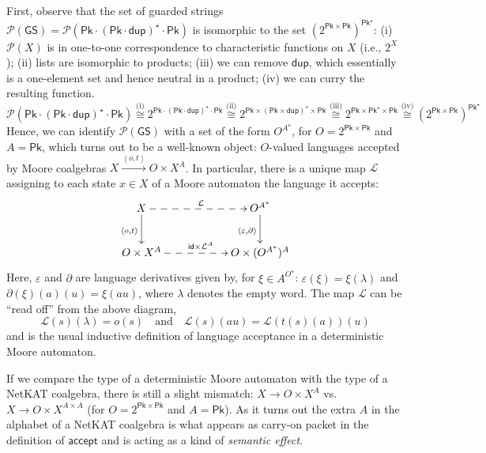 \documentclass[acmsmall,dvipsnames,nonacm]{acmart}
\newcommand\Pk{\mathsf{Pk}}
\newcommand\dup{\mathsf{dup}}
\newcommand\GSdef{\Pk \cdot (\Pk\cdot\dup)^\star\cdot\Pk}
\newcommand\GS{\mathsf{GS}}
\newcommand\accept{\mathsf{accept}}
\newcommand\NetKAT{\textsf{NetKAT}\xspace}
\newcommand\pow[1]{\mathcal{P}(#1)}
\begin{document}
First, observe that the set of guarded strings $\pow\GS = \pow\GSdef$
is isomorphic to the set $\left(2^{\Pk\times\Pk}\right)^{\Pk^\star}$:
%
(i) $\pow X$ is in one-to-one correspondence to characteristic
functions on $X$ (i.e., $2^X$);
%
(ii) lists are isomorphic to
products;
%
(iii) we can remove $\dup$, which essentially is a one-element set and
hence neutral in a product;
%
(iv) we can curry the resulting function.
\begin{equation}\label{eq:iso}
\!\!\!\pow\GSdef \stackrel{\text{(i)}}\cong 2^{\GSdef} \stackrel{\text{(ii)}}\cong 2^{\Pk\times{(\Pk\times \dup)^\star}\times\Pk}  \stackrel{\text{(iii)}}\cong 2^{\Pk\times{\Pk^\star}\times\Pk} \stackrel{\text{(iv)}}\cong \left(2^{\Pk\times\Pk}\right)^{\Pk^\star}
\end{equation}
%
Hence, we can identify $\pow\GS$ with a set of the form $O^{A^\star}$,
for $O=2^{\Pk\times\Pk}$ and $A=\Pk$, which turns out to be a
well-known object: $O$-valued languages accepted by Moore coalgebras
$X \xrightarrow{\left<o,t\right>} O \times X^A$. In particular, there
is a unique map $\mathcal L$ assigning to each state $x\in X$ of a
Moore automaton the language it accepts:
\begin{equation}\label{eq:finalMoore}
\xymatrix@C=2cm{X \ar@{-->}[r]^{\mathcal L}\ar[d]_{\left<o,t\right>}& O^{A^*}\ar[d]_{\left<\varepsilon,\partial\right>}\\
O\times X^A \ar@{-->}[r]^{\mathsf{id}\times \mathcal L^A} & O\times (O^{A^*})^{A}
}
\end{equation}
Here, $\varepsilon$ and $\partial$ are language derivatives given by,
for $\xi\in A^{O^\star}$: $\varepsilon(\xi) = \xi(\lambda)$ and
$\partial(\xi)(a)(u) = \xi(au)$, where $\lambda$ denotes the empty
word. The map $\mathcal L$ can be ``read off'' from the above diagram,
%
\[
\mathcal L(s)(\lambda) = o(s) \quad\text{and} \quad \mathcal L(s)(au) = \mathcal L(t(s)(a))(u)
\]
%
and is the usual inductive definition of language acceptance in a
deterministic Moore automaton.

If we compare the type of a deterministic Moore automaton with the
type of a \NetKAT coalgebra, there is still a slight mismatch: $X \to
O \times X^A$ vs. $X \to O \times X^{A\times A}$ (for
$O=2^{\Pk\times\Pk}$ and $A=\Pk$). As it turns out the extra $A$ in
the alphabet of a \NetKAT coalgebra is what appears as carry-on packet
in the definition of $\accept$ and is acting as a kind of {\em
  semantic effect}.
\end{document}
